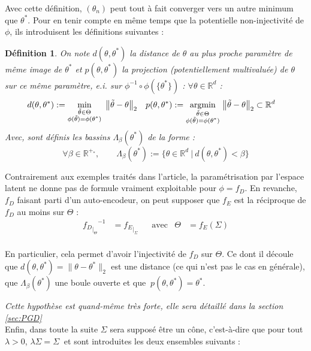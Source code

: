 \documentclass[hidelinks, french]{article} %
\newcommand{\R}{\mathbb{R}}
\newcommand{\argmin}[1]{\underset{#1}{\text{argmin}}}
\theoremstyle{enonce}
\newtheorem{definition}{Définition}
\theoremstyle{special}
\theoremstyle{rq}
\theoremstyle{exo}
\theoremstyle{demo}
\begin{document}
Avec cette définition, $(\theta_n)$ peut tout à fait converger vers un autre minimum que $\theta^*$. Pour en tenir compte en même temps que la potentielle non-injectivité de $\phi$, ils introduisent les définitions suivantes :
\\
\begin{definition}\label{def:boule}
On note $d(\theta,\theta^*)$ la distance de $\theta$ au plus proche paramètre de même image de $\theta^*$ et $p(\theta,\theta^*)$ la projection (potentiellement multivaluée) de $\theta$ sur ce même paramètre, e.i. sur $\phi^{-1}\circ\phi(\{\theta^*\})$ :
 $\forall\theta\in\R^d$ :
\begin{align*}d(\theta,\theta^*) &:=\min_{\substack{\Tilde{\theta}\in\Theta\\ \phi(\Tilde{\theta})=\phi(\theta^*)}}\ \big\|\Tilde{\theta}-\theta\big\|_2  &  p(\theta,\theta^*)&:=\argmin{\substack{\Tilde{\theta}\in\Theta\\ \phi(\Tilde{\theta})=\phi(\theta^*)}}\ \big\|\Tilde{\theta}-\theta\big\|_2\subset\R^d\end{align*}
Avec, sont définis les bassins $\Lambda_\beta(\theta^*)$ de la forme :
\[\forall \beta\in\R^{+_*},\qquad \Lambda_\beta(\theta^*):=\big\{\theta\in\R^d\ |\ d(\theta, \theta^*)<\beta\big\}\]
\end{definition}

Contrairement aux exemples traités dans l'article, la paramétrisation par l'espace latent ne donne pas de formule vraiment exploitable pour $\phi=f_D$. En revanche, $f_D$ faisant parti d'un auto-encodeur, on peut supposer que $f_E$ est la réciproque de $f_D$ au moins sur $\Theta$ :
\begin{align*} {{f_{D}}_{\displaystyle |_{\Theta}}}^{-1}&={f_{E}}_{\displaystyle |_{\Sigma}}  & &\text{avec} & \Theta&=f_E(\Sigma)
\end{align*}
\\
En particulier, cela permet d'avoir l'injectivité de $f_D$ sur $\Theta$. Ce dont il découle que $d(\theta,\theta^*)=\|\theta-\theta^*\|_2$ est une distance (ce qui n'est pas le cas en générale), que $\Lambda_\beta(\theta^*)$ une boule ouverte et que $\ p(\theta,\theta^*)=\theta^*$.

\emph{Cette hypothèse est quand-même très forte, elle sera détaillé dans la section \ref{sec:PGD}}
\\

Enfin, dans toute la suite $\Sigma$ sera supposé être un cône, c'est-à-dire que pour tout $\lambda>0$, $\lambda\Sigma=\Sigma\ $ et sont introduites les deux ensembles suivants :
\\
\end{document}
